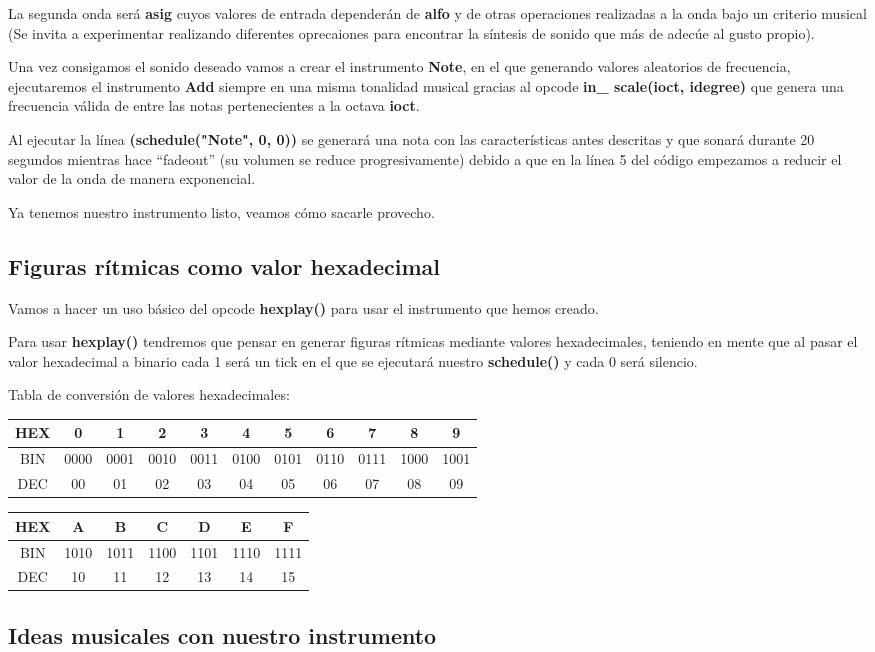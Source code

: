 La segunda onda será \textbf{asig} cuyos valores de entrada dependerán de \textbf{alfo} y de otras operaciones realizadas a la onda bajo un criterio musical (Se invita a experimentar realizando diferentes oprecaiones para encontrar la síntesis de sonido que más de adecúe al gusto propio).

Una vez consigamos el sonido deseado vamos a crear el instrumento \textbf{Note}, en el que generando valores aleatorios de frecuencia, ejecutaremos el instrumento \textbf{Add} siempre en una misma tonalidad musical gracias al opcode \textbf{in\_ scale(ioct, idegree)} que genera una frecuencia válida de entre las notas pertenecientes a la octava \textbf{ioct}.

Al ejecutar la línea \textbf{(schedule("Note", 0, 0))} se generará una nota con las características antes descritas y que sonará durante 20 segundos mientras hace ``fadeout'' (su volumen se reduce progresivamente) debido a que en la línea 5 del código empezamos a reducir el valor de la onda de manera exponencial.

Ya tenemos nuestro instrumento listo, veamos cómo sacarle provecho.

\subsection{Figuras rítmicas como valor hexadecimal}

Vamos a hacer un uso básico del opcode \textbf{hexplay()} para usar el instrumento que hemos creado. 

Para usar \textbf{hexplay()} tendremos que pensar en generar figuras rítmicas mediante valores hexadecimales, teniendo en mente que al pasar el valor hexadecimal a binario cada 1 será un tick en el que se ejecutará nuestro \textbf{schedule()} y cada 0 será silencio.

Tabla de conversión de valores hexadecimales:
\begin{center}
 \begin{tabular}{||c c c c c c c c c c c||} 
 \hline
 HEX & 0 & 1 & 2 & 3 & 4 & 5 & 6 & 7 & 8 & 9 \\
 \hline
 BIN & 0000 & 0001 & 0010 & 0011 & 0100 & 0101 & 0110 & 0111 & 1000 & 1001 \\ 
 \hline
 DEC & 00 & 01 & 02 & 03 & 04 & 05 & 06 & 07 & 08 & 09\\
 \hline
\end{tabular}
\end{center}

\begin{center}
 \begin{tabular}{||c c c c c c c||} 
 \hline
 HEX & A & B & C & D & E & F \\
 \hline
 BIN & 1010 & 1011 & 1100 & 1101 & 1110 & 1111\\ 
 \hline
 DEC & 10 & 11 & 12 & 13 & 14 & 15 \\
 \hline
\end{tabular}
\end{center}
\pagebreak
{}

\subsection{Ideas musicales con nuestro instrumento}


 

